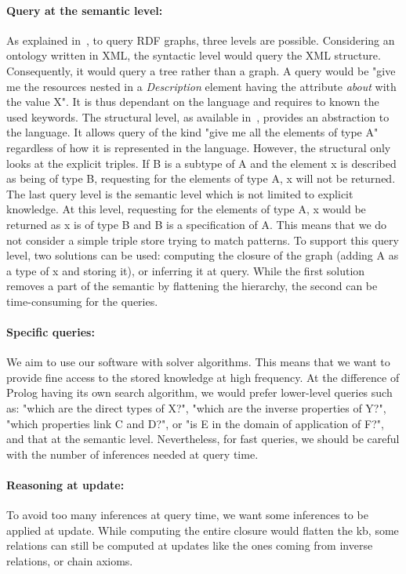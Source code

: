 \paragraph{Query at the semantic level:} As explained in~\cite{broekstra_2002_sesame}, to query RDF graphs, three levels are possible. Considering an ontology written in XML, the syntactic level would query the XML structure. Consequently, it would query a tree rather than a graph. A query would be "give me the resources nested in a \textit{Description} element having the attribute \textit{about} with the value X". It is thus dependant on the language and requires to known the used keywords. The structural level, as available in~\cite{lassila_1998_resource}, provides an abstraction to the language. It allows query of the kind "give me all the elements of type A" regardless of how it is represented in the language. However, the structural only looks at the explicit triples. If B is a subtype of A and the element x is described as being of type B, requesting for the elements of type A, x will not be returned. The last query level is the semantic level which is not limited to explicit knowledge. At this level, requesting for the elements of type A, x would be returned as x is of type B and B is a specification of A. This means that we do not consider a simple triple store trying to match patterns. To support this query level, two solutions can be used: computing the closure of the graph (adding A as a type of x and storing it), or inferring it at query. While the first solution removes a part of the semantic by flattening the hierarchy, the second can be time-consuming for the queries.

\paragraph{Specific queries:} We aim to use our software with solver algorithms. This means that we want to provide fine access to the stored knowledge at high frequency. At the difference of Prolog having its own search algorithm, we would prefer lower-level queries such as: "which are the direct types of X?", "which are the inverse properties of Y?", "which properties link C and D?", or "is E in the domain of application of F?", and that at the semantic level. Nevertheless, for fast queries, we should be careful with the number of inferences needed at query time.

\paragraph{Reasoning at update:} To avoid too many inferences at query time, we want some inferences to be applied at update. While computing the entire closure would flatten the \acrshort{kb}, some relations can still be computed at updates like the ones coming from inverse relations, or chain axioms.

